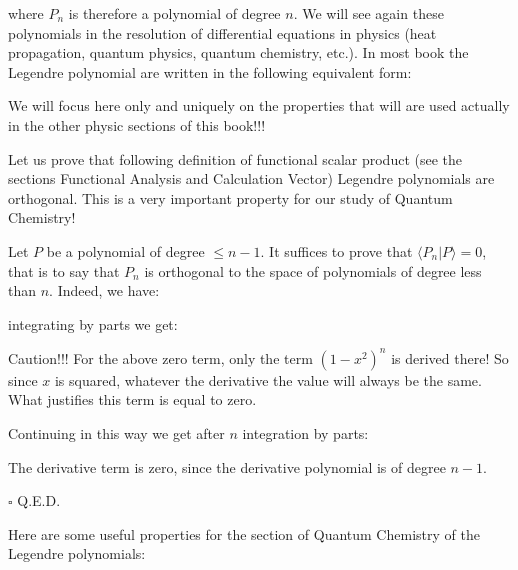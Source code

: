 	where $P_n$ is therefore a polynomial of degree $n$. We will see again these polynomials in the resolution of differential equations in physics (heat propagation, quantum physics, quantum chemistry, etc.). In most book the Legendre polynomial are written in the following equivalent form:
	
	We will focus here only and uniquely on the properties that will are used actually in the other physic sections of this book!!!
	
	Let us prove that following definition of functional scalar product (see the sections Functional Analysis and Calculation Vector) Legendre polynomials are orthogonal. This is a very important property for our study of Quantum Chemistry!
	
	\begin{dem}
	Let $P$ be a polynomial of degree $\leq n-1$. It suffices to prove that $\langle P_n | P \rangle =0$, that is to say that $P_n$ is orthogonal to the space of polynomials of degree less than $n$. Indeed, we have:
	
	integrating by parts we get:
	
	Caution!!! For the above zero term, only the term $(1-x^2)^n$ is derived there! So since $x$ is squared, whatever the derivative the value will always be the same. What justifies this term is equal to zero.
	
	Continuing in this way we get after $n$ integration by parts:
	
	\begin{tcolorbox}[title=Remark,colframe=black,arc=10pt]
	The derivative term is zero, since the derivative polynomial is of degree $n-1$.
	\end{tcolorbox}
	\begin{flushright}
		$\square$  Q.E.D.
	\end{flushright}
	\end{dem}	
	Here are some useful properties for the section of Quantum Chemistry of the Legendre polynomials:
